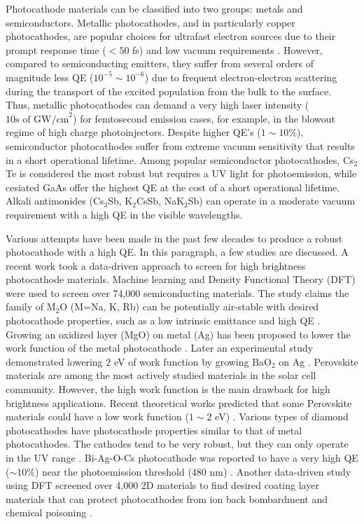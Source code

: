 Photocathode materials can be classified into two groups: metals and semiconductors.
Metallic photocathodes, and in particularly copper photocathodes, are popular choices for ultrafast electron sources due to their prompt response time ($<50$ fs) and low vacuum requirements \cite{ttm,plasmon}. However, compared to semiconducting emitters, they suffer from several orders of magnitude less QE ($10^{-5} \sim 10^{-6}$) due to frequent electron-electron scattering during the transport of the excited population from the bulk to the surface. Thus, metallic photocathodes can demand a very high laser intensity   ($\textrm{10s of GW/cm}^2$) for femtosecond emission cases, for example, in the blowout regime\cite{blowout} of high charge photoinjectors.
Despite higher QE's ($1 \sim 10 \%$), semiconductor photocathodes suffer from extreme vacuum sensitivity that results in a short operational lifetime. Among popular semiconductor photocathodes, Cs$_2$Te is considered the most robust but requires a UV light for photoemission, while cesiated GaAs offer the highest QE at the cost of a short operational lifetime. Alkali antimonides (Cs$_3$Sb, K$_2$CsSb, NaK$_2$Sb) can operate in a moderate vacuum requirement with a high QE in the visible wavelengths.

Various attempts have been made in the past few decades to produce a robust photocathode with a high QE.
In this paragraph, a few studies are discussed.
A recent work took a data-driven approach to screen for high brightness photocathode materials. Machine learning and Density Functional Theory (DFT) were used to screen over 74,000 semiconducting materials. The study claims the family of M$_2$O (M=Na, K, Rb) can be potentially air-stable with desired photocathode properties, such as a low intrinsic emittance and high QE \cite{antoniuk2021novel}.
Growing an oxidized layer (MgO) on metal (Ag) has been proposed to lower the work function of the metal photocathode \cite{nemeth2010high}. Later an experimental study demonstrated lowering 2 eV of work function by growing BaO$_2$ on Ag \cite{droubay2015work}.
Perovskite materials are among the most actively studied materials in the solar cell community. However, the high work function is the main drawback for high brightness applications. Recent theoretical works predicted that some Perovskite materials could have a low work function ($1 \sim 2$ eV) \cite{ma2021discovery,jacobs2016understanding}.
Various types of diamond photocathodes have photocathode properties similar to that of metal photocathodes. The cathodes tend to be very robust, but they can only operate in the UV range \cite{perez2014high,velardi2016highly}.
Bi-Ag-O-Cs photocathode was reported to have a very high QE ($\sim$10\%) near the photoemission threshold (480 nm) \cite{sommer1961bismuth, sommer1956multi}.
Another data-driven study using DFT screened over 4,000 2D materials to find desired coating layer materials that can protect photocathodes from ion back bombardment and chemical poisoning \cite{wang2018overcoming,wang2020computational}.

